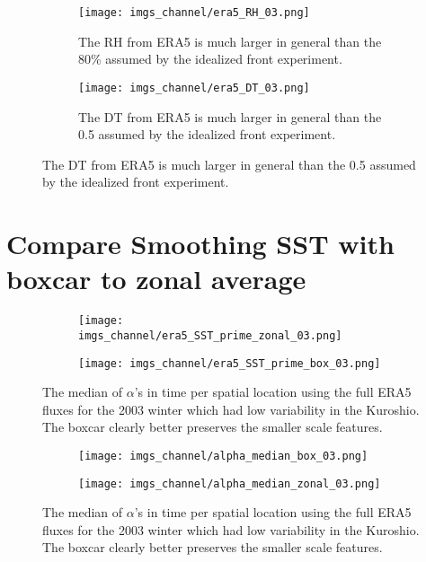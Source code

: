 \documentclass[12pt,a4paper]{article}
\begin{document}
\begin{figure}[h!]
\centering
\begin{subfigure}[t]{0.49\textwidth}
\texttt{[image: imgs\_channel/era5\_RH\_03.png]}
\caption{The RH from ERA5 is much larger in general than the 80\% assumed by the idealized front experiment.}
\end{subfigure}
\begin{subfigure}[t]{0.49\textwidth}
\texttt{[image: imgs\_channel/era5\_DT\_03.png]}
\caption{The DT from ERA5 is much larger in general than the 0.5 assumed by the idealized front experiment.}
\end{subfigure}

\end{figure}

\section{Compare Smoothing SST with boxcar to zonal average}

\begin{figure}[h!]
\centering
\begin{subfigure}[t]{\textwidth}
\texttt{[image: imgs\_channel/era5\_SST\_prime\_zonal\_03.png]}
\end{subfigure}
\begin{subfigure}[t]{\textwidth}
\texttt{[image: imgs\_channel/era5\_SST\_prime\_box\_03.png]}
\end{subfigure}
\caption{The median of $\alpha$'s in time per spatial location using the full ERA5 fluxes for the 2003 winter which had low variability in the Kuroshio. The boxcar clearly better preserves the smaller scale features.}
\end{figure}

\begin{figure}[h!]
\centering
\begin{subfigure}[t]{\textwidth}
\texttt{[image: imgs\_channel/alpha\_median\_box\_03.png]}
\end{subfigure}
\begin{subfigure}[t]{\textwidth}
\texttt{[image: imgs\_channel/alpha\_median\_zonal\_03.png]}
\end{subfigure}
\caption{The median of $\alpha$'s in time per spatial location using the full ERA5 fluxes for the 2003 winter which had low variability in the Kuroshio. The boxcar clearly better preserves the smaller scale features.}
\end{figure}
\end{document}
